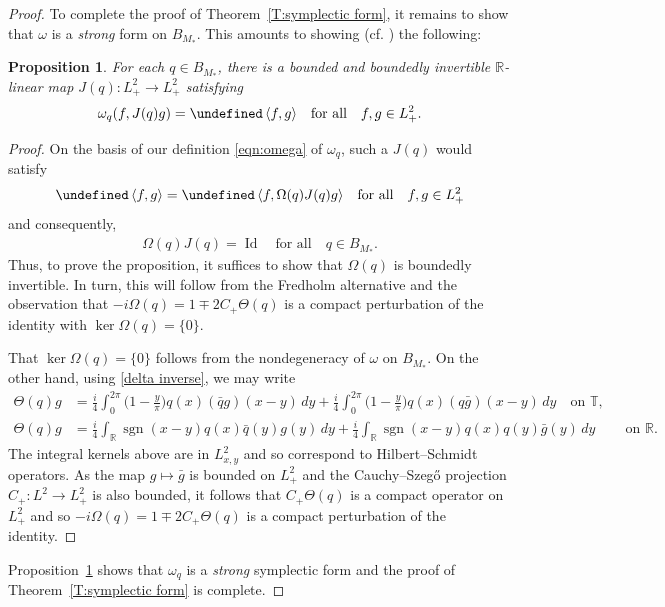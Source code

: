 \documentclass{amsart}
\numberwithin{equation}{section}
\newtheorem{proposition}[theorem]{Proposition}
\theoremstyle{definition}
\newcommand{\om}{\omega}
\newcommand{\Om}{\Omega}
\newcommand{\R}{\mathbb{R}}
\newcommand{\T}{\mathbb{T}}
\DeclareMathOperator{\sgn}{sgn}
\DeclareMathOperator{\Id}{Id}
\let\Re=\undefined\DeclareMathOperator{\Re}{Re}
\newcommand{\qtq}[1]{\quad\text{#1}\quad}
\begin{document}
\begin{proof}
To complete the proof of Theorem~\ref{T:symplectic form}, it remains to show that $\om$ is a \emph{strong} form on $B_{M_*}$.  This amounts to showing (cf. \cite{chernoff2006properties}) the following:

\begin{proposition}\label{P:J}
For each $q\in B_{M_*}$, there is a bounded and boundedly invertible $\R$-linear map $J(q):L^2_+\to L^2_+$ satisfying
\begin{align}\label{J}
\om_q(f, J(q)g) = \Re \,\langle f, g\rangle \qtq{for all} f,g\in L^2_+.
\end{align}
\end{proposition}

\begin{proof}
On the basis of our definition \eqref{eqn:omega} of $\om_q$, such a $J(q)$ would satisfy
$$
\Re\, \langle f, g\rangle = \Re\, \langle f, \Om(q) J(q) g\rangle \qtq{for all} f,g\in L^2_+
$$ 
and consequently, 
\begin{align}\label{J inv}
\Om(q) J(q) = \Id \qtq{for all} q\in B_{M_*}.
\end{align}
Thus, to prove the proposition, it suffices to show that $\Om(q)$ is boundedly invertible.  In turn, this will follow from the Fredholm alternative and the observation that $-i\Om(q)= 1\mp 2 C_+ \Theta(q)$ is a compact perturbation of the identity with $\ker\Om(q)=\{0\}$.

That $\ker\Om(q)=\{0\}$ follows from the nondegeneracy of $\om$ on $B_{M_*}$.  On the other hand, using \eqref{delta inverse}, we may write
\begin{align*}
\Theta(q)g&=\tfrac{i}{4}\!\int_{0}^{2\pi}\!\bigl(1-\tfrac{y}{\pi}\bigr)q(x)(\bar{q}g)(x-y)\,dy +\tfrac{i}{4}\!\int_{0}^{2\pi}\!\bigl(1-\tfrac{y}{\pi}\bigr)q(x)(q\bar{g})(x-y)\,dy \quad\text{on $\T$},\\
\Theta(q)g&=\tfrac{i}{4}\!\int_\R\sgn(x-y)q(x)\bar{q}(y) g(y) \,dy+\tfrac{i}{4}\!\int_\R\sgn(x-y) q(x)q(y)\bar{g}(y)\,dy \qquad \, \text{on $\R$}.
\end{align*}
The integral kernels above are in $L^2_{x,y}$ and so correspond to Hilbert--Schmidt operators. As the map $g\mapsto \bar{g}$ is bounded on $L^2_+$ and the Cauchy--Szeg\H{o} projection $ C_+:L^2\rightarrow L^2_+$ is also bounded, it follows that $C_+ \Theta(q)$ is a compact operator on $L^2_+$ and so $-i\Om(q)= 1\mp 2 C_+ \Theta(q)$ is a compact perturbation of the identity.
\end{proof}

Proposition~\ref{P:J} shows that $\omega_q$ is a \emph{strong} symplectic form and the proof of Theorem~\ref{T:symplectic form} is complete.
\end{proof}
\end{document}
